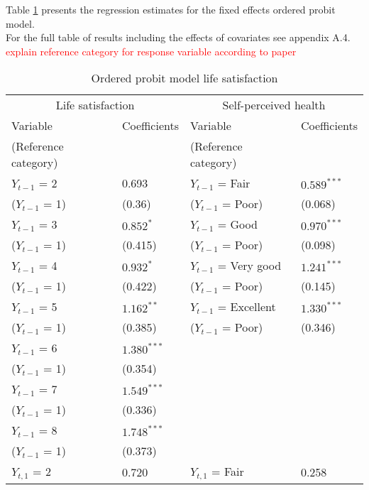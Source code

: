 \documentclass[12pt]{article}
\begin{document}
Table \ref{probit} presents the regression estimates for the fixed effects ordered probit model.\\
For the full table of results including the effects of covariates see appendix A.4. 
\textcolor{red}{explain reference category for response variable according to paper}
\begin{table}[htbp]
\centering
\footnotesize
\caption{Ordered probit model life satisfaction}
\label{probit}
\begin{tabular}{ll ll}
\hline
\multicolumn{2}{c}{Life satisfaction} & \multicolumn{2}{c}{Self-perceived health}\\
Variable & Coefficients & Variable & Coefficients\\
(Reference category) & & (Reference category) & \\\hline\hline
$Y_{t-1}$ = 2               &  0.693            & $Y_{t-1}$ = Fair            &  $0.589^{***}$ \\
($Y_{t-1}$ = 1)             &  (0.36)           & ($Y_{t-1}$ = Poor)          &  (0.068)        \\
$Y_{t-1}$ = 3               &  $0.852^{*}$      & $Y_{t-1}$ = Good            &  $0.970^{***}$\\
($Y_{t-1}$ = 1)             &  (0.415)          & ($Y_{t-1}$ = Poor)          &  (0.098)        \\
$Y_{t-1}$ = 4               &  $0.932^{*}$      & $Y_{t-1}$ = Very good       &  $1.241^{***}$  \\
($Y_{t-1}$ = 1)             &  (0.422)          & ($Y_{t-1}$ = Poor)          &  (0.145)        \\
$Y_{t-1}$ = 5               &  $1.162^{**}$     & $Y_{t-1}$ = Excellent       &  $1.330^{***}$  \\
($Y_{t-1}$ = 1)             &  (0.385)          & ($Y_{t-1}$ = Poor)          &  (0.346)\\
$Y_{t-1}$ = 6               &  $1.380^{***}$&&\\
($Y_{t-1}$ = 1)             &  (0.354)      &&\\
$Y_{t-1}$ = 7               &  $1.549^{***}$&&\\
($Y_{t-1}$ = 1)             &  (0.336)      &&\\
$Y_{t-1}$ = 8               &  $1.748^{***}$&&\\
($Y_{t-1}$ = 1)             &  (0.373)      &&\\
$Y_{t,1}$ = 2               &  0.720            & $Y_{t,1}$ = Fair            &  0.258\\

\end{tabular}
\end{table}
\end{document}

